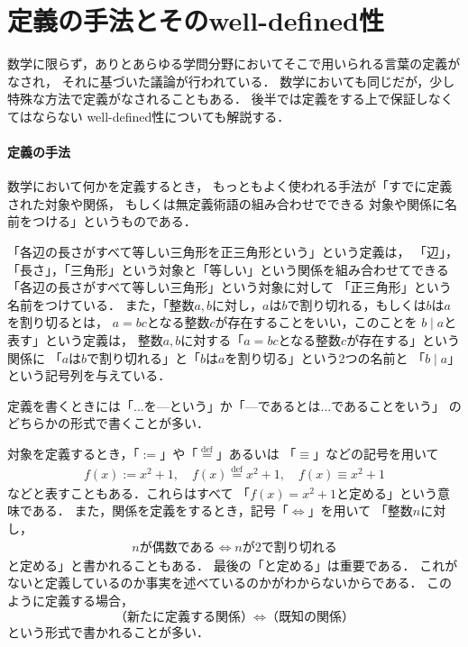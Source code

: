  \section{定義の手法とそのwell-defined性}
 \label{sec:welldef}
  数学に限らず，ありとあらゆる学問分野においてそこで用いられる言葉の定義がなされ，
  それに基づいた議論が行われている．
  数学においても同じだが，少し特殊な方法で定義がなされることもある．
  後半では定義をする上で保証しなくてはならない
  well-defined性についても解説する．

 \paragraph{定義の手法}
  数学において何かを定義するとき，
  もっともよく使われる手法が「すでに定義された対象や関係，
  もしくは無定義術語の組み合わせでできる
  対象や関係に名前をつける」というものである．
  \begin{ex} \label{ex:defhutuu}
    「各辺の長さがすべて等しい三角形を正三角形という」という定義は，
    「辺」，「長さ」，「三角形」という対象と「等しい」という関係を組み合わせてできる
    「各辺の長さがすべて等しい三角形」という対象に対して
    「正三角形」という名前をつけている．
    また，「整数$a,b$に対し，$a$は$b$で割り切れる，もしくは$b$は$a$を割り切るとは，
    $a=bc$となる整数$c$が存在することをいい，このことを
    $b \mid a$と表す」という定義は，
    整数$a,b$に対する「$a=bc$となる整数$c$が存在する」という関係に
    「$a$は$b$で割り切れる」と「$b$は$a$を割り切る」という2つの名前と
    「$b \mid a$」という記号列を与えている．
  \end{ex}

  定義を書くときには「...を---という」か「---であるとは...であることをいう」
  のどちらかの形式で書くことが多い．

  対象を定義するとき，「${:=}$」や「$\overset{\mathrm{def}}{=}$」あるいは
  「$\equiv$」などの記号を用いて
  \begin{align*}
    f(x) := {x^2 + 1} , \quad 
    f(x) \overset{\mathrm{def}}{=} x^2 + 1 , \quad
    f(x) \equiv x^2+1
  \end{align*}
  などと表すこともある．これらはすべて
  「$f(x)=x^2+1$と定める」という意味である．
  また，関係を定義をするとき，記号「$\Longleftrightarrow$」を用いて
  「整数$n$に対し，
  \begin{align*}
    n \text{が偶数である} \Longleftrightarrow n \text{が2で割り切れる}
  \end{align*}
  と定める」と書かれることもある．
  最後の「と定める」は重要である．
  これがないと定義しているのか事実を述べているのかがわからないからである．
  このように定義する場合，
  \[
    \text{（新たに定義する関係）} \Longleftrightarrow \text{（既知の関係）}
  \]
  という形式で書かれることが多い．

